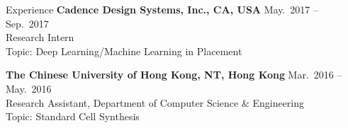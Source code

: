 
\begin{rSection}{Experience}
{\bf Cadence Design Systems, Inc., CA, USA}               \hfill { May.~2017 -- Sep.~2017} \\
Research Intern \\
Topic: Deep Learning/Machine Learning in Placement

{\bf The Chinese University of Hong Kong, NT, Hong Kong}  \hfill { Mar.~2016 -- May.~2016} \\ 
Research Assistant, Department of Computer Science \& Engineering \\
Topic: Standard Cell Synthesis




\end{rSection}


